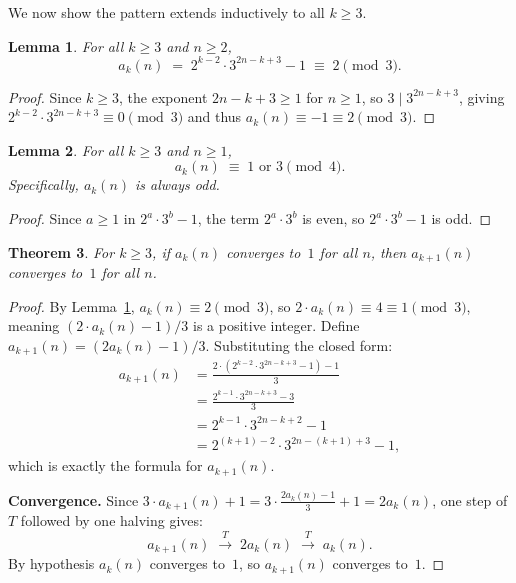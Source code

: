 \documentclass[12pt]{amsart}
\newtheorem{theorem}{Theorem}[section]
\newtheorem{lemma}[theorem]{Lemma}
\theoremstyle{definition}
\begin{document}
We now show the pattern extends inductively to all $k \geq 3$.

\begin{lemma}\label{lem:mod3}
  For all $k \geq 3$ and $n \geq 2$,
  \[
    a_k(n) \;=\; 2^{k-2} \cdot 3^{2n-k+3} - 1 \;\equiv\; 2 \pmod{3}.
  \]
\end{lemma}

\begin{proof}
  Since $k \geq 3$, the exponent $2n - k + 3 \geq 1$ for $n \geq 1$, so
  $3 \mid 3^{2n-k+3}$, giving $2^{k-2} \cdot 3^{2n-k+3} \equiv 0 \pmod 3$
  and thus $a_k(n) \equiv -1 \equiv 2 \pmod{3}$.
\end{proof}

\begin{lemma}\label{lem:mod4}
  For all $k \geq 3$ and $n \geq 1$,
  \[
    a_k(n) \;\equiv\; 1 \text{ or } 3 \pmod{4}.
  \]
  Specifically, $a_k(n)$ is always odd.
\end{lemma}

\begin{proof}
  Since $a \geq 1$ in $2^a \cdot 3^b - 1$, the term $2^a \cdot 3^b$ is even,
  so $2^a \cdot 3^b - 1$ is odd.
\end{proof}

\begin{theorem}\label{thm:inductive_step}
  For $k \geq 3$, if $a_k(n)$ converges to~$1$ for all $n$, then
  $a_{k+1}(n)$ converges to~$1$ for all $n$.
\end{theorem}

\begin{proof}
  By Lemma~\ref{lem:mod3}, $a_k(n) \equiv 2 \pmod{3}$, so
  $2 \cdot a_k(n) \equiv 4 \equiv 1 \pmod{3}$, meaning
  $(2 \cdot a_k(n) - 1)/3$ is a positive integer.
  Define $a_{k+1}(n) = (2 a_k(n) - 1)/3$.
  Substituting the closed form:
  \begin{align*}
    a_{k+1}(n)
    &= \frac{2 \cdot (2^{k-2} \cdot 3^{2n-k+3} - 1) - 1}{3} \\
    &= \frac{2^{k-1} \cdot 3^{2n-k+3} - 3}{3} \\
    &= 2^{k-1} \cdot 3^{2n-k+2} - 1 \\
    &= 2^{(k+1)-2} \cdot 3^{2n-(k+1)+3} - 1,
  \end{align*}
  which is exactly the formula for $a_{k+1}(n)$.

  \textbf{Convergence.}
  Since $3 \cdot a_{k+1}(n) + 1 = 3 \cdot \frac{2a_k(n)-1}{3} + 1 = 2 a_k(n)$,
  one step of $T$ followed by one halving gives:
  \[
    a_{k+1}(n) \;\xrightarrow{T}\; 2 a_k(n) \;\xrightarrow{T}\; a_k(n).
  \]
  By hypothesis $a_k(n)$ converges to~$1$, so $a_{k+1}(n)$ converges to~$1$.
\end{proof}
\end{document}
